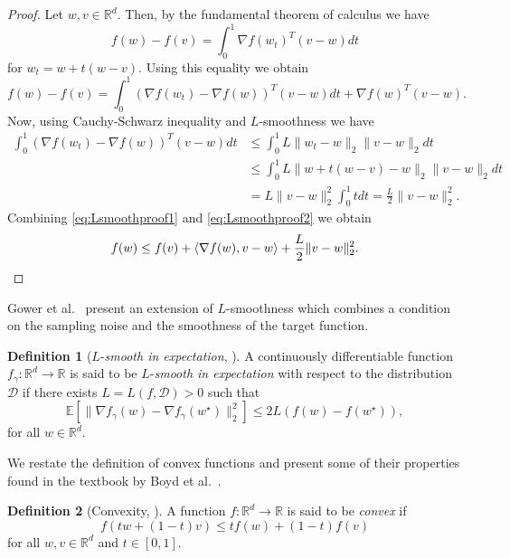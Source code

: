 \documentclass[12pt]{article}
\theoremstyle{definition}
\newtheorem{definition}[definition]{Definition}
\numberwithin{equation}{section}
\newcommand{\R}{\mathbb{R}}
\newcommand{\norm}[1]{\lVert{#1}\rVert_2}
\begin{document}
\begin{proof}
  Let $w, v \in \R^d$. Then, by the fundamental theorem of calculus we have
  $$
  f(w) - f(v) = \int_0^1 \nabla f(w_t)^T(v-w)dt 
  $$
  for $w_t = w + t(w-v)$.
  Using this equality we obtain
  \begin{equation}
    \label{eq:Lsmoothproof1}
    f(w) - f(v) = \int_0^1 (\nabla f(w_t) - \nabla f(w))^T(v-w)dt + \nabla f(w)^T(v-w).
  \end{equation}
  Now, using Cauchy-Schwarz inequality and $L$-smoothness we have
  \begin{equation}
    \label{eq:Lsmoothproof2}
    \begin{split}
      \int_0^1 (\nabla f(w_t) - \nabla f(w))^T(v-w)dt &\leq \int_0^1 L \norm{w_t-w} \norm{v-w}dt \\
      &\leq \int_0^1 L \norm{w + t(w - v) -w} \norm{v-w}dt \\
      &= L \norm{v-w}^2 \int_0^1 t dt = \frac{L}{2} \norm{v-w}^2.
    \end{split}
  \end{equation}
  Combining \eqref{eq:Lsmoothproof1} and \eqref{eq:Lsmoothproof2} we obtain
  \begin{equation*}
    f(w) \leq f(v) + \langle \nabla f(w), v - w \rangle + \frac{L}{2} \norm{v - w}^2. \qedhere
  \end{equation*}
\end{proof}
Gower et al.\ \cite{gowerSGDGeneralAnalysis2019} present an extension of $L$-smoothness which combines a condition on the sampling noise and the smoothness of the target function.
\begin{definition}[$L$-\emph{smooth in expectation}, ]
  A continuously differentiable  function $f_{\gamma}:\R^d \rightarrow \R$ is said to be $L$-\emph{smooth in expectation} with respect to the distribution $\mathcal{D}$ if there exists $L = L(f, \mathcal{D}) > 0$ such that 
  \begin{equation}
    \mathbb{E}[\norm{\nabla f_{\gamma}(w) - \nabla f_{\gamma}(w^\star)}^2] \leq 2 L(f(w) - f(w^\star)),
  \end{equation}
  for all $w \in \R^d$. 
\end{definition}
We restate the definition of convex functions and present some of their properties found in the textbook by Boyd et al.\ \cite{boydConvexOptimization2004}.
\begin{definition}[Convexity, ]
  A function $f : \R^d \rightarrow \R$ is said to be \emph{convex} if 
  \begin{equation}
    f(tw+(1-t)v) \leq tf(w)+(1-t)f(v)
  \end{equation}
  for all $w,v \in \R^d$ and $t \in [0,1]$.
\end{definition}
\end{document}

